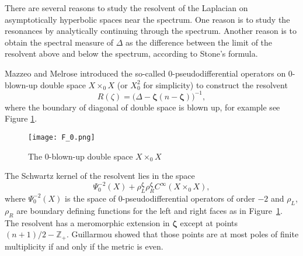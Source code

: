 \documentclass[10pt, a4paper, twoside]{amsart}
\numberwithin{equation}{section}
\theoremstyle{remark}
\begin{document}
There are several reasons to study the resolvent of the Laplacian on asymptotically hyperbolic spaces near the spectrum. One reason is to study the resonances by analytically continuing through the spectrum. Another reason is to obtain the spectral measure of $\Delta$ as the difference between the limit of the resolvent above and below the spectrum, according to Stone's formula.

Mazzeo and Melrose \cite{Mazzeo-Melrose} introduced the so-called $0$-pseudodifferential operators on $0$-blown-up double space $X \times_0 X$ (or $X^2_0$ for simplicity) to construct the resolvent $$R(\zeta) = \big(\Delta - {{\boldsymbol\zeta
}} (n - {{\boldsymbol\zeta
}})\big)^{-1},$$ where the boundary of diagonal of double space is blown up, for example see Figure \ref{fig: blown-up double space}. 
\begin{figure}
\texttt{[image: F\_0.png]}\caption{\label{fig: blown-up double space}The $0$-blown-up double space $X \times_0 X$}
\end{figure}
 The Schwartz kernel of the resolvent lies in the space 
\begin{equation}\Psi^{-2}_0(X) + \rho_L^{{\boldsymbol\zeta
}} \rho_R^{{\boldsymbol\zeta
}} C^\infty(X \times_0 X),
\label{MM}\end{equation} 
where $\Psi_0^{-2}(X)$ is the space of $0$-pseudodifferential operators of order $-2$ and $\rho_L$, $\rho_R$ are boundary defining functions for the left and right faces as in Figure~\ref{fig: blown-up double space}. The resolvent has a meromorphic extension in ${{\boldsymbol\zeta
}}$ except at points $(n + 1)/2 - \mathbb{Z}_+$.  Guillarmou \cite{Guillarmou} showed that those points are at most poles of finite multiplicity if and only if the metric is even.
\end{document}
